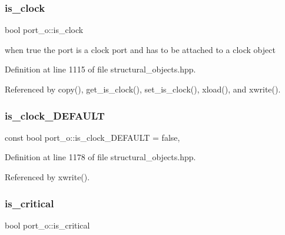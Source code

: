 \subsubsection{\texorpdfstring{is\+\_\+clock}{is\_clock}}
{\footnotesize\ttfamily bool port\+\_\+o\+::is\+\_\+clock\hspace{0.3cm}{\ttfamily [private]}}



when true the port is a clock port and has to be attached to a clock object 



Definition at line 1115 of file structural\+\_\+objects.\+hpp.



Referenced by copy(), get\+\_\+is\+\_\+clock(), set\+\_\+is\+\_\+clock(), xload(), and xwrite().

\mbox{\label{structport__o_ac9568d87a28bf0f3fbc797f772cd1394}} 
\subsubsection{\texorpdfstring{is\+\_\+clock\+\_\+\+D\+E\+F\+A\+U\+LT}{is\_clock\_DEFAULT}}
{\footnotesize\ttfamily const bool port\+\_\+o\+::is\+\_\+clock\+\_\+\+D\+E\+F\+A\+U\+LT = false\hspace{0.3cm}{\ttfamily [static]}, {\ttfamily [private]}}



Definition at line 1178 of file structural\+\_\+objects.\+hpp.



Referenced by xwrite().

\mbox{\label{structport__o_a32d081be17055c0423a5a69df0c22d54}} 
\subsubsection{\texorpdfstring{is\+\_\+critical}{is\_critical}}
{\footnotesize\ttfamily bool port\+\_\+o\+::is\+\_\+critical\hspace{0.3cm}{\ttfamily [private]}}



